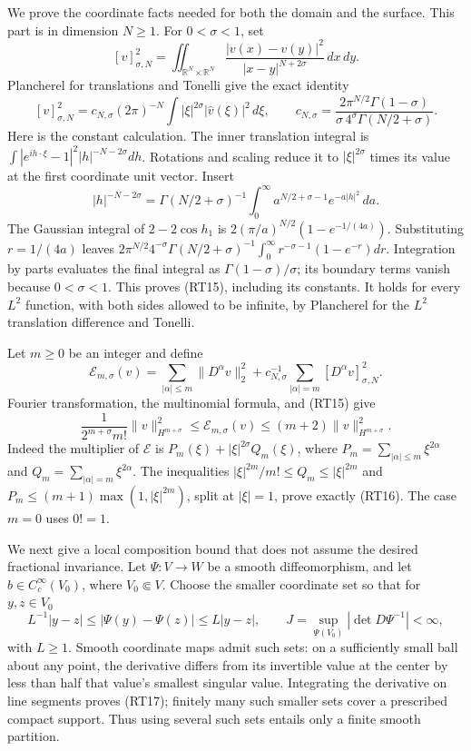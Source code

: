 \documentclass[
  11pt,
]{article}
\begin{document}
We prove the coordinate facts needed for both the domain and the
surface. This part is in dimension \(N\geq1\). For \(0<\sigma<1\), set
\[
 [v]_{\sigma,N}^2=\iint_{\mathbb R^N\times\mathbb R^N}
 \frac{|v(x)-v(y)|^2}{|x-y|^{N+2\sigma}}\,dx\,dy.
\] Plancherel for translations and Tonelli give the exact identity \[
 [v]_{\sigma,N}^2
 =c_{N,\sigma}(2\pi)^{-N}\int |\xi|^{2\sigma}|\widehat v(\xi)|^2\,d\xi,
 \qquad
 c_{N,\sigma}=
 \frac{2\pi^{N/2}\Gamma(1-\sigma)}{\sigma\,4^\sigma\Gamma(N/2+\sigma)}.
 \tag{RT15}
\] Here is the constant calculation. The inner translation integral is
\(\int |e^{ih\cdot\xi}-1|^2|h|^{-N-2\sigma}dh\). Rotations and scaling
reduce it to \(|\xi|^{2\sigma}\) times its value at the first coordinate
unit vector. Insert \[
 |h|^{-N-2\sigma}
 =\Gamma(N/2+\sigma)^{-1}
   \int_0^\infty a^{N/2+\sigma-1}e^{-a|h|^2}\,da.
\] The Gaussian integral of \(2-2\cos h_1\) is
\(2(\pi/a)^{N/2}(1-e^{-1/(4a)})\). Substituting \(r=1/(4a)\) leaves
\(2\pi^{N/2}4^{-\sigma}\Gamma(N/2+\sigma)^{-1}
\int_0^\infty r^{-\sigma-1}(1-e^{-r})dr\). Integration by parts
evaluates the final integral as \(\Gamma(1-\sigma)/\sigma\); its
boundary terms vanish because \(0<\sigma<1\). This proves (RT15),
including its constants. It holds for every \(L^2\) function, with both
sides allowed to be infinite, by Plancherel for the \(L^2\) translation
difference and Tonelli.

Let \(m\geq0\) be an integer and define \[
 \mathcal E_{m,\sigma}(v)
 =\sum_{|\alpha|\leq m}\|D^\alpha v\|_2^2
  +c_{N,\sigma}^{-1}\sum_{|\alpha|=m}[D^\alpha v]_{\sigma,N}^2.
\] Fourier transformation, the multinomial formula, and (RT15) give \[
 \frac1{2^{m+\sigma}m!}\|v\|_{H^{m+\sigma}}^2
 \leq\mathcal E_{m,\sigma}(v)
 \leq(m+2)\|v\|_{H^{m+\sigma}}^2.
 \tag{RT16}
\] Indeed the multiplier of \(\mathcal E\) is
\(P_m(\xi)+|\xi|^{2\sigma}Q_m(\xi)\), where
\(P_m=\sum_{|\alpha|\leq m}\xi^{2\alpha}\) and
\(Q_m=\sum_{|\alpha|=m}\xi^{2\alpha}\). The inequalities
\(|\xi|^{2m}/m!\leq Q_m\leq|\xi|^{2m}\) and
\(P_m\leq(m+1)\max(1,|\xi|^{2m})\), split at \(|\xi|=1\), prove exactly
(RT16). The case \(m=0\) uses \(0!=1\).

We next give a local composition bound that does not assume the desired
fractional invariance. Let \(\Psi:V\to W\) be a smooth diffeomorphism,
and let \(b\in C_c^\infty(V_0)\), where \(V_0\Subset V\). Choose the
smaller coordinate set so that for \(y,z\in V_0\) \[
 L^{-1}|y-z|\leq|\Psi(y)-\Psi(z)|\leq L|y-z|,
 \qquad
 J=\sup_{\Psi(V_0)}|\det D\Psi^{-1}|<\infty,
 \tag{RT17}
\] with \(L\geq1\). Smooth coordinate maps admit such sets: on a
sufficiently small ball about any point, the derivative differs from its
invertible value at the center by less than half that value's smallest
singular value. Integrating the derivative on line segments proves
(RT17); finitely many such smaller sets cover a prescribed compact
support. Thus using several such sets entails only a finite smooth
partition.
\end{document}
